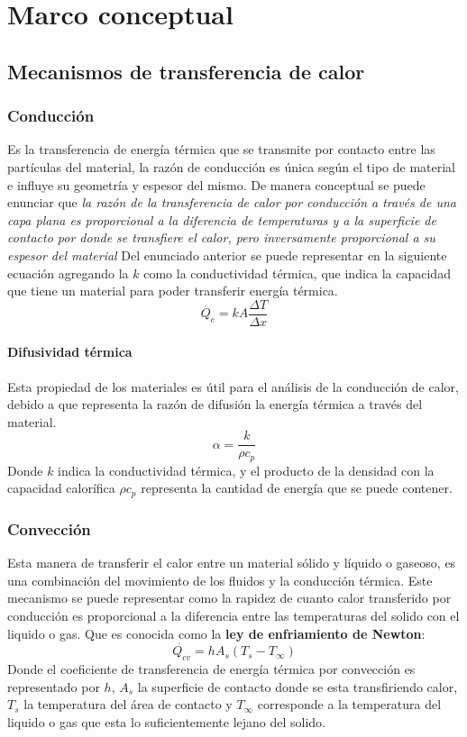 
\chapter{Marco conceptual}

\section{Mecanismos de transferencia de calor}
\subsection{Conducción}
	Es la transferencia de energía térmica que se transmite por contacto entre las partículas del material, la razón de conducción es única según el tipo de material e influye su geometría y espesor del mismo. De manera conceptual se puede enunciar que \textit{la razón de la transferencia de calor por conducción a través de una capa plana es proporcional a la diferencia de temperaturas y a la superficie de contacto por donde se transfiere el calor, pero inversamente proporcional a su espesor del material}
	\newline
	Del enunciado anterior se puede representar en la siguiente ecuación agregando la $k$ como la conductividad térmica, que indica la capacidad que tiene un material para poder transferir energía térmica\cite{Cengel2022}.
	\begin{equation}
		\dot{Q_{c}}=kA\frac{\Delta T}{\Delta x}
	\end{equation}
\subsubsection{Difusividad térmica}
	Esta propiedad de los materiales es útil para el análisis de la conducción de calor, debido a que representa la razón de difusión la energía térmica a través del material\cite{Cengel2022}.
	\begin{equation}
		\alpha = \frac{k}{\rho c_p}
	\end{equation}
	Donde $k$ indica la conductividad térmica, y el producto de la densidad con la capacidad calorífica $\rho c_p$ representa la cantidad de energía que se puede contener.
\subsection{Convección}
Esta manera de transferir el calor entre un material sólido y líquido o gaseoso, es una combinación del movimiento de los fluidos y la conducción térmica. Este mecanismo se puede representar como la rapidez de cuanto calor transferido por conducción es proporcional a la diferencia entre las temperaturas del solido con el liquido o gas. Que es conocida como la \textbf{ley de enfriamiento de Newton}\cite{Cengel2022}:
	\begin{equation}
		\dot{Q_{cv}} = hA_s(T_s-T_\infty)
	\end{equation}
Donde el coeficiente de transferencia de energía térmica por convección es representado por $h$, $A_s$ la superficie de contacto donde se esta transfiriendo calor, $T_s$ la temperatura del área de contacto y $T_\infty$ corresponde a la temperatura del liquido o gas que esta lo suficientemente lejano del solido.	
